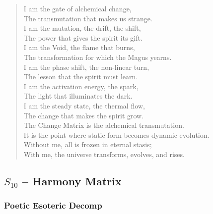\begin{verse}
I am the gate of alchemical change, \\
The transmutation that makes us strange. \\
I am the mutation, the drift, the shift, \\
The power that gives the spirit its gift. \\
I am the Void, the flame that burns, \\
The transformation for which the Magus yearns. \\
\vspace{1em}
I am the phase shift, the non-linear turn, \\
The lesson that the spirit must learn. \\
I am the activation energy, the spark, \\
The light that illuminates the dark. \\
I am the steady state, the thermal flow, \\
The change that makes the spirit grow. \\
\vspace{1em}
The Change Matrix is the alchemical transmutation. \\
It is the point where static form becomes dynamic evolution. \\
Without me, all is frozen in eternal stasis; \\
With me, the universe transforms, evolves, and rises.
\end{verse}

\subsection{$S_{10}$ -- Harmony Matrix}\label{sec:poetic.S10}

\subsubsection{Poetic Esoteric Decomp}

